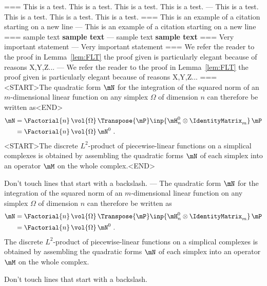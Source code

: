 ===
This is a test. This is a test. This is a test. This is a test. %
---
This is a test. This is a test. This is a test. This is a test. %
===
This is an example of a citation starting on a new line
\cite{Newton1687}
---
This is an example of a citation starting on a new line \cite{Newton1687}
===
sample text
\textbf{sample text}
---
sample text \textbf{sample text}
===
Very important statement
---
Very important statement
===
We refer the reader to the proof in Lemma~\ref{lem:FLT}
the proof given is particularly elegant because of reasons X,Y,Z...
---
We refer the reader to the proof in Lemma~\ref{lem:FLT}
the proof given is particularly elegant because of reasons X,Y,Z...
===
<START>The quadratic form $\mN$ for the integration of the squared norm of an $m$-dimensional linear function on any simplex $\Omega$ of dimension $n$ can therefore be written as<END>
\begin{align}
\label{eq:integration_matrix}
\mN &= \Factorial{n} \, \vol{\Omega} \, \Transpose{\mP} \inp{\mH^0_n \otimes \IdentityMatrix_m} \, \mP \nonumber\\%
    &= \Factorial{n} \, \vol{\Omega} \, \mN^0~.
\end{align}
<START>The discrete $L^2$-product of piecewise-linear functions on a simplical complexes is obtained by assembling the quadratic forms $\mN$ of each simplex into an operator $\mM$ on the whole complex.<END>

Don't touch lines that start with a backslash.
---
The quadratic form $\mN$ for the integration of the squared norm of an
$m$-dimensional linear function on any simplex $\Omega$ of dimension $n$ can
therefore be written as
\begin{align}
\label{eq:integration_matrix}
\mN &= \Factorial{n} \, \vol{\Omega} \, \Transpose{\mP} \inp{\mH^0_n \otimes \IdentityMatrix_m} \, \mP \nonumber\\%
    &= \Factorial{n} \, \vol{\Omega} \, \mN^0~.
\end{align}
The discrete $L^2$-product of piecewise-linear functions on a simplical
complexes is obtained by assembling the quadratic forms $\mN$ of each simplex
into an operator $\mM$ on the whole complex.

Don't touch lines that start with a backslash.
